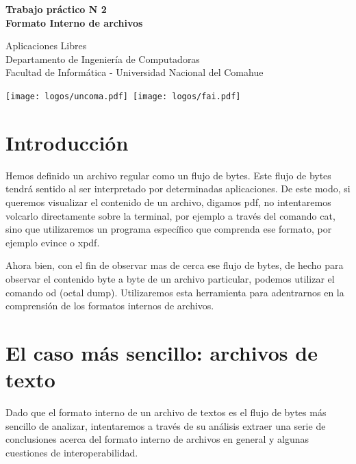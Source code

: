 \documentclass[12pt]{article}
\def\maketitle{

 \makeatletter
 {\color{bl} \centering \huge \sc \textbf{
Trabajo práctico N 2 \\
\large \vspace*{-8pt} \color{black} Formato Interno de archivos
 \vspace*{8pt} }\par}
 \makeatother


 \makeatletter
 {\centering \small 
	Aplicaciones Libres\\
 	Departamento de Ingeniería de Computadoras \\
 	Facultad de Informática - Universidad Nacional del Comahue \\
 	\vspace{20pt} }
 \makeatother

\vspace{-2.5cm}
\mbox{\hspace{-1cm}\texttt{[image: logos/uncoma.pdf]}\hspace{12cm}
    \texttt{[image: logos/fai.pdf]}}

}
\begin{document}
\thispagestyle{empty}
\maketitle
\setlength{\parindent}{0pt}


\section*{Introducción}
Hemos definido un archivo regular como un flujo de bytes. Este flujo de bytes
tendrá sentido al ser interpretado por determinadas aplicaciones. De este modo, 
si queremos visualizar el contenido de un archivo, digamos pdf, no intentaremos
volcarlo directamente sobre la terminal, por ejemplo a través del comando cat, 
sino que utilizaremos un programa específico que comprenda ese formato, por ejemplo 
evince o xpdf. 

Ahora bien, con el fin de observar mas de cerca ese flujo de bytes, de hecho para 
observar el contenido byte a byte de un archivo particular, podemos utilizar el 
comando od (octal dump). Utilizaremos esta herramienta para adentrarnos en 
la comprensión de los formatos internos de archivos.  

\section*{El caso más sencillo: archivos de texto}
Dado que el formato interno de un archivo de textos es el flujo de bytes más
sencillo de analizar, intentaremos a través de su análisis extraer una serie 
de conclusiones acerca del formato interno de archivos en general y algunas 
cuestiones de interoperabilidad. 
\end{document}
